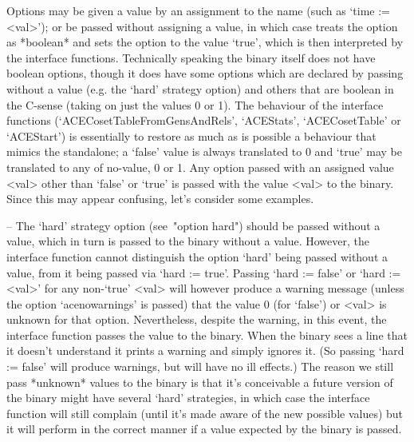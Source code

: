 
Options may be given a value by an assignment to  the  name  (such  as
`time := <val>'); or be passed without assigning  a  value,  in  which
case {\GAP} treats the option as *boolean* and sets the option to  the
value `true', which  is  then  interpreted  by  the  {\ACE}  interface
functions. Technically speaking the {\ACE} binary itself does not have
boolean options, though it does have some options which  are  declared
by passing without a value  (e.g.  the  `hard'  strategy  option)  and
others that are boolean in the C-sense (taking on just the values 0 or
1).   The   behaviour    of    the    {\ACE}    interface    functions
(`ACECosetTableFromGensAndRels',   `ACEStats',   `ACECosetTable'    or
`ACEStart') is essentially  to  restore  as  much  as  is  possible  a
behaviour that mimics the {\ACE} standalone; a `false' value is always
translated to 0 and `true' may be translated to any of no-value, 0  or
1. Any option passed with an assigned value <val> other  than  `false'
or `true' is passed with the value <val> to the {\ACE}  binary.  Since
this may appear confusing, let's consider some examples.

\beginlist

\item{--} The `hard' strategy option  (see~"option  hard")  should  be
passed without a value, which in turn is passed to the  {\ACE}  binary
without  a  value.  However,  the  {\ACE}  interface  function  cannot
distinguish the option `hard' being passed without a  value,  from  it
being passed via `hard := true'. Passing `hard := false' or  `hard  :=
<val>' for any non-`true' <val> will however produce a warning message
(unless the option `acenowarnings' is passed) that the  value  0  (for
`false') or <val> is unknown for that  option.  Nevertheless,  despite
the warning, in this event, the {\ACE} interface function  passes  the
value to the {\ACE} binary. When the {\ACE} binary sees a line that it
doesn't understand it prints a warning  and  simply  ignores  it.  (So
passing `hard := false' will produce warnings, but will  have  no  ill
effects.) The reason we still pass  *unknown*  values  to  the  {\ACE}
binary is that it's conceivable a future version of the {\ACE}  binary
might have  several  `hard'  strategies,  in  which  case  the  {\ACE}
interface function will still complain (until it's made aware  of  the
new possible values) but it will perform in the correct  manner  if  a
value expected by the {\ACE} binary is passed.

